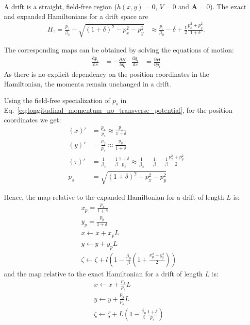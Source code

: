 A drift is a straight, field-free region ($h(x,y)=0$, $V=0$ and
$\mathbf{A}=0$).  The exact and expanded Hamiltonians for a drift space are
\begin{align}
  H_\tau =
    \frac{p_\tau}{\beta_0}  - \sqrt{(1+\delta)^2 - p_x^2 - p_y^2}
  &\approx
    \frac{p_\tau}{\beta_0} - \delta + \frac{1}{2}\frac{p_x^2+p_y^2}{1+\delta}.
\end{align}

The corresponding maps can be obtained by solving the equations of motion:
\begin{align}
  \frac{\text{d} p_i}{\text{d}s} &= -\frac{\partial H}{\partial q_i} &
  \frac{\text{d} q_i}{\text{d}s} &=  \frac{\partial H}{\partial p_i}
\end{align}
As there is no explicit dependency on the position coordinates in the Hamiltonian, the
momenta remain unchanged in a drift.

Using the field-free specialization of $p_s$ in
Eq.~\eqref{eq:longitudinal_momentum_no_transverse_potential}, for the
position coordinates we get:
\begin{align}
  \left(x\right)' &=
        \frac{p_x}{p_s}
        \approx \frac{p_x}{1+\delta} \\
  \left(y\right)' &=
        \frac{p_y}{p_s}
        \approx \frac{p_y}{1+\delta} \\
  \left(\tau\right)' &=
        \frac{1}{\beta_0} - \frac{1}{\beta}\frac{1+\delta}{p_s}
        \approx \frac{1}{\beta_0} - \frac{1}{\beta} - \frac{1}{\beta}
                \frac{p_x^2 + p_y^2}{2} \\
  p_s &=
        \sqrt{(1+\delta)^2 - p_x^2 - p_y^2}
\end{align}

Hence, the map relative to the expanded Hamiltonian for a drift of length $L$ is:
\begin{align}
  &x_p = \frac{p_x}{1+\delta} \\
  &y_p = \frac{p_y}{1+\delta}  \\
  &x  \leftarrow x + x_p L \\
  &y  \leftarrow y + y_p L \\
  &\zeta
    \leftarrow \zeta+
    l\left(1- \frac{\beta_0}{\beta}\left(1 + \frac{x_p^2+y_p^2}{2}\right)\right)
\end{align}
and the map relative to the exact Hamiltonian for a drift of length $L$ is:
\begin{align}
  &x \leftarrow x + \frac{p_x}{p_s} L\\
  &y \leftarrow y + \frac{p_y}{p_s} L\\
  &\zeta \leftarrow \zeta + L\left(
          1-\frac{\beta_0}{\beta}\frac{1+\delta}{p_s}
          \right)
\end{align}

